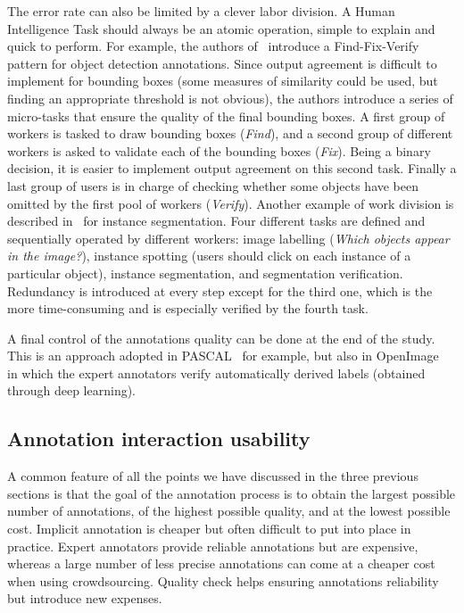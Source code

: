 The error rate can also be limited by a clever labor division.
A Human Intelligence Task should always be an atomic operation,
simple to explain and quick to perform.
For example, the authors of~\cite{su2012crowdsourcing} introduce
a Find-Fix-Verify pattern for object detection annotations.
Since output agreement is difficult to implement for bounding boxes
(some measures of similarity could be used, but finding an appropriate threshold is not obvious),
the authors introduce a series of micro-tasks
that ensure the quality of the final bounding boxes.
A first group of workers is tasked to draw bounding boxes (\textit{Find}),
and a second group of different workers is asked to validate
each of the bounding boxes (\textit{Fix}).
Being a binary decision,
it is easier to implement output agreement on this second task.
Finally a last group of users is in charge of checking whether
some objects have been omitted by the first pool of workers (\textit{Verify}).
Another example of work division is described
in~\cite{chen2015microsoft} for instance segmentation.
Four different tasks are defined and sequentially operated by different workers:
image labelling (\textit{Which objects appear in the image?}),
instance spotting (users should click on each instance of a particular object),
instance segmentation, and segmentation verification.
Redundancy is introduced at every step except for the third one,
which is the more time-consuming and is especially verified by the fourth task.


A final control of the annotations quality can be done at the end of the study.
This is an approach adopted in PASCAL~\cite{Everingham10} for example,
but also in OpenImage~\cite{OpenImages} in which the expert annotators
verify automatically derived labels (obtained through deep learning).


\subsection{Annotation interaction usability}

A common feature of all the points we have discussed
in the three previous sections is that the goal of the annotation process
is to obtain the largest possible number of annotations,
of the highest possible quality, and at the lowest possible cost.
Implicit annotation is cheaper but often difficult to put into place in practice.
Expert annotators provide reliable annotations but are expensive,
whereas a large number of less precise annotations can come
at a cheaper cost when using crowdsourcing.
Quality check helps ensuring annotations reliability but introduce new expenses.


